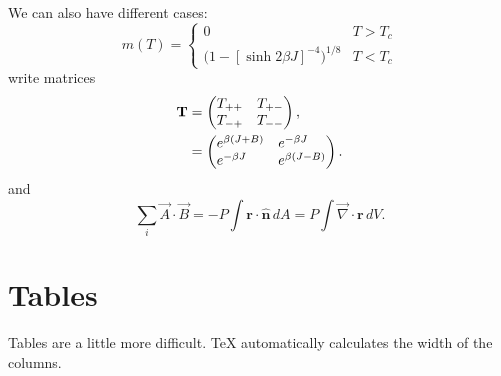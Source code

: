 \documentclass[12pt]{article}
\begin{document}
			      We can also have different cases:
			      \begin{equation}
			      \label{eq:mdiv}
			      m(T) =
			      \begin{cases}
			      0 & \text{$T > T_c$} \\
				      \bigl(1 - [\sinh 2 \beta J]^{-4} \bigr)^{\! 1/8} & \text{$T < T_c$}
				      \end{cases}
				      \end{equation}
				      write matrices
				      \begin{align}
				      \textbf{T} &=
				      \begin{pmatrix}
				      T_{++} \hfill & T_{+-} \\
					      T_{-+} & T_{--} \hfill 
					      \end{pmatrix} , \nonumber \\
						      & =
						      \begin{pmatrix}
						      e^{\beta (J + B)} \hfill & e^{-\beta J} \hfill \\
							      e^{-\beta J} \hfill & e^{\beta (J - B)} \hfill
							      \end{pmatrix}.
							      \end{align}
							      and 
							      \newcommand{\rv}{\textbf{r}}
							      \begin{equation}
							      \sum_i \vec A \cdot \vec B = -P\!\int\! \rv \cdot
							      \hat{\mathbf{n}}\, dA = P\!\int \! {\vec \nabla} \cdot \rv\, dV.
							      \end{equation}

							      \section{Tables}
							      Tables are a little more difficult. TeX
							      automatically calculates the width of the columns.
\end{document}
